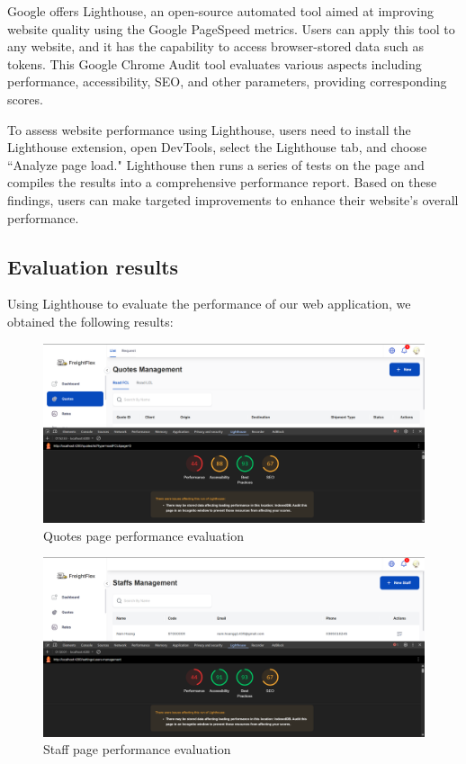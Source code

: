 Google offers Lighthouse, an open-source automated tool aimed at improving website quality using the Google PageSpeed metrics. Users can apply this tool to any website, and it has the capability to access browser-stored data such as tokens. This Google Chrome Audit tool evaluates various aspects including performance, accessibility, SEO, and other parameters, providing corresponding scores.

To assess website performance using Lighthouse, users need to install the Lighthouse extension, open DevTools, select the Lighthouse tab, and choose ``Analyze page load." Lighthouse then runs a series of tests on the page and compiles the results into a comprehensive performance report. Based on these findings, users can make targeted improvements to enhance their website's overall performance.
\subsection{Evaluation results}
Using Lighthouse to evaluate the performance of our web application, we obtained the following results:
\begin{figure}[H]
  \centering
  \includegraphics[width=15cm]{graphics/chapter6/quotes.png}
  \caption{Quotes page performance evaluation}
  \label{fig:quotes}
\end{figure}

\begin{figure}[H]
  \centering
  \includegraphics[width=15cm]{graphics/chapter6/staff_before.png}
  \caption{Staff page performance evaluation}
  \label{fig:staff_before}
\end{figure}

